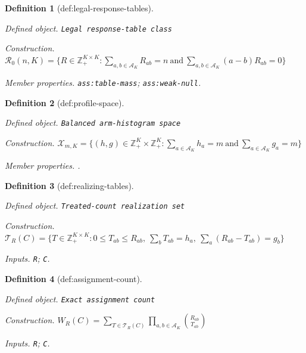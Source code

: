 \documentclass{article}
\newtheorem{definition}{Definition}
\begin{document}
\begin{definition}[def:legal-response-tables]\label{def:legal-response-tables}
\par\smallskip\noindent\emph{Defined object.} \texttt{Legal response-\allowbreak{}table class}
\par\smallskip\noindent\emph{Construction.} \(\mathcal R_0(n,K)=\{R\in\mathbb Z_+^{K\times K}:\sum_{a,b\in\mathcal A_K}R_{ab}=n\ \text{and}\ \sum_{a,b\in\mathcal A_K}(a-b)R_{ab}=0\}\)
\par\smallskip\noindent\emph{Member properties.} \texttt{ass:\allowbreak{}table-\allowbreak{}mass}; \texttt{ass:\allowbreak{}weak-\allowbreak{}null}.
\end{definition}

\begin{definition}[def:profile-space]\label{def:profile-space}
\par\smallskip\noindent\emph{Defined object.} \texttt{Balanced arm-\allowbreak{}histogram space}
\par\smallskip\noindent\emph{Construction.} \(\mathcal X_{m,K}=\{(h,g)\in\mathbb Z_+^K\times\mathbb Z_+^K:\sum_{a\in\mathcal A_K}h_a=m\ \text{and}\ \sum_{a\in\mathcal A_K}g_a=m\}\)
\par\smallskip\noindent\emph{Member properties.} .
\end{definition}

\begin{definition}[def:realizing-tables]\label{def:realizing-tables}
\par\smallskip\noindent\emph{Defined object.} \texttt{Treated-\allowbreak{}count realization set}
\par\smallskip\noindent\emph{Construction.} \(\mathcal T_R(C)=\{T\in\mathbb Z_+^{K\times K}:0\leq T_{ab}\leq R_{ab},\ \sum_bT_{ab}=h_a,\ \sum_a(R_{ab}-T_{ab})=g_b\}\)
\par\smallskip\noindent\emph{Inputs.} \texttt{R}; \texttt{C}.
\end{definition}

\begin{definition}[def:assignment-count]\label{def:assignment-count}
\par\smallskip\noindent\emph{Defined object.} \texttt{Exact assignment count}
\par\smallskip\noindent\emph{Construction.} \(W_R(C)=\sum_{T\in\mathcal T_R(C)}\prod_{a,b\in\mathcal A_K}\binom{R_{ab}}{T_{ab}}\)
\par\smallskip\noindent\emph{Inputs.} \texttt{R}; \texttt{C}.
\end{definition}
\end{document}

